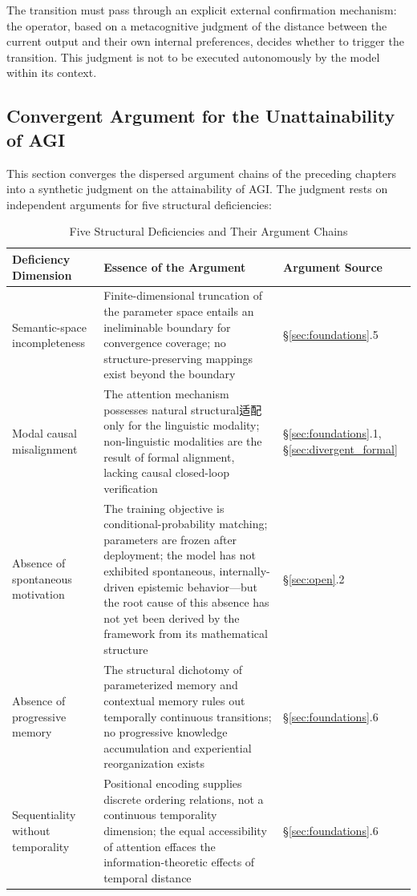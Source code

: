 \documentclass[11pt,a4paper]{article}
\theoremstyle{definition}
\begin{document}
The transition must pass through an explicit external confirmation mechanism: the operator, based on a metacognitive judgment of the distance between the current output and their own internal preferences, decides whether to trigger the transition. This judgment is not to be executed autonomously by the model within its context.

\subsection{Convergent Argument for the Unattainability of AGI}
\label{sec:agi}

This section converges the dispersed argument chains of the preceding chapters into a synthetic judgment on the attainability of AGI. The judgment rests on independent arguments for five structural deficiencies:

\begin{table}[H]
\centering
\caption{Five Structural Deficiencies and Their Argument Chains}
\begin{tabular}{@{}p{3cm}p{5cm}p{4cm}@{}}
\toprule
\textbf{Deficiency Dimension} & \textbf{Essence of the Argument} & \textbf{Argument Source} \\
\midrule
Semantic-space incompleteness & Finite-dimensional truncation of the parameter space entails an ineliminable boundary for convergence coverage; no structure-preserving mappings exist beyond the boundary & \S\ref{sec:foundations}.5 \\
Modal causal misalignment & The attention mechanism possesses natural structural适配 only for the linguistic modality; non-linguistic modalities are the result of formal alignment, lacking causal closed-loop verification & \S\ref{sec:foundations}.1, \S\ref{sec:divergent_formal} \\
Absence of spontaneous motivation & The training objective is conditional-probability matching; parameters are frozen after deployment; the model has not exhibited spontaneous, internally-driven epistemic behavior---but the root cause of this absence has not yet been derived by the framework from its mathematical structure & \S\ref{sec:open}.2 \\
Absence of progressive memory & The structural dichotomy of parameterized memory and contextual memory rules out temporally continuous transitions; no progressive knowledge accumulation and experiential reorganization exists & \S\ref{sec:foundations}.6 \\
Sequentiality without temporality & Positional encoding supplies discrete ordering relations, not a continuous temporality dimension; the equal accessibility of attention effaces the information-theoretic effects of temporal distance & \S\ref{sec:foundations}.6 \\
\bottomrule
\end{tabular}
\end{table}
\end{document}
